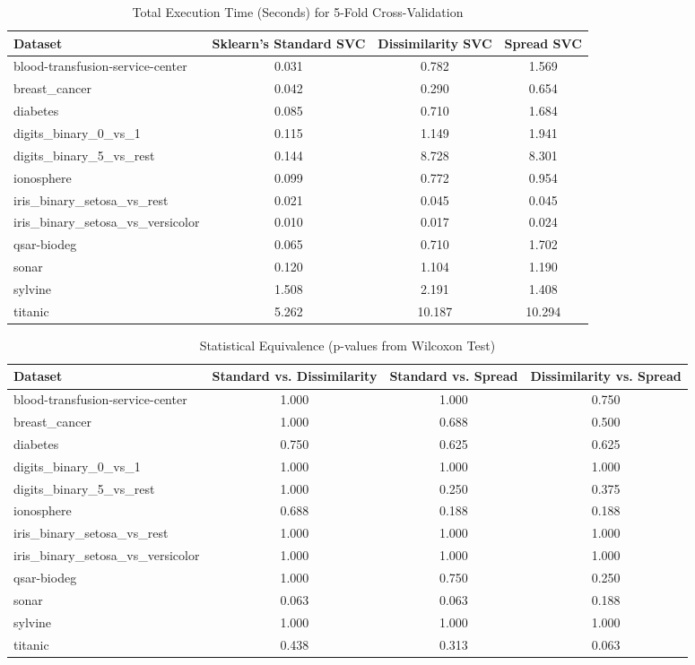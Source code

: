 \documentclass[conference]{IEEEtran}
\begin{document}
\begin{table}[htbp]
\caption{Total Execution Time (Seconds) for 5-Fold Cross-Validation}
\begin{center}
\begin{tabular}{lccc}
\toprule
\textbf{Dataset} & \textbf{Sklearn's Standard SVC} & \textbf{Dissimilarity SVC} & \textbf{Spread SVC} \\
\midrule
blood-transfusion-service-center & 0.031 & 0.782 & 1.569 \\
breast\_cancer & 0.042 & 0.290 & 0.654 \\
diabetes & 0.085 & 0.710 & 1.684 \\
digits\_binary\_0\_vs\_1 & 0.115 & 1.149 & 1.941 \\
digits\_binary\_5\_vs\_rest & 0.144 & 8.728 & 8.301 \\
ionosphere & 0.099 & 0.772 & 0.954 \\
iris\_binary\_setosa\_vs\_rest & 0.021 & 0.045 & 0.045 \\
iris\_binary\_setosa\_vs\_versicolor & 0.010 & 0.017 & 0.024 \\
qsar-biodeg & 0.065 & 0.710 & 1.702 \\
sonar & 0.120 & 1.104 & 1.190 \\
sylvine & 1.508 & 2.191 & 1.408 \\
titanic & 5.262 & 10.187 & 10.294 \\
\bottomrule
\end{tabular}
\label{tab:time}
\end{center}
\end{table}

\begin{table}[htbp]
\caption{Statistical Equivalence (p-values from Wilcoxon Test)}
\begin{center}
\begin{tabular}{lccc}
\toprule
\textbf{Dataset} & \textbf{Standard vs. Dissimilarity} & \textbf{Standard vs. Spread} & \textbf{Dissimilarity vs. Spread} \\
\midrule
blood-transfusion-service-center & 1.000 & 1.000 & 0.750 \\
breast\_cancer & 1.000 & 0.688 & 0.500 \\
diabetes & 0.750 & 0.625 & 0.625 \\
digits\_binary\_0\_vs\_1 & 1.000 & 1.000 & 1.000 \\
digits\_binary\_5\_vs\_rest & 1.000 & 0.250 & 0.375 \\
ionosphere & 0.688 & 0.188 & 0.188 \\
iris\_binary\_setosa\_vs\_rest & 1.000 & 1.000 & 1.000 \\
iris\_binary\_setosa\_vs\_versicolor & 1.000 & 1.000 & 1.000 \\
qsar-biodeg & 1.000 & 0.750 & 0.250 \\
sonar & 0.063 & 0.063 & 0.188 \\
sylvine & 1.000 & 1.000 & 1.000 \\
titanic & 0.438 & 0.313 & 0.063 \\
\bottomrule
\end{tabular}
\label{tab:stats}
\end{center}
\end{table}
\end{document}
